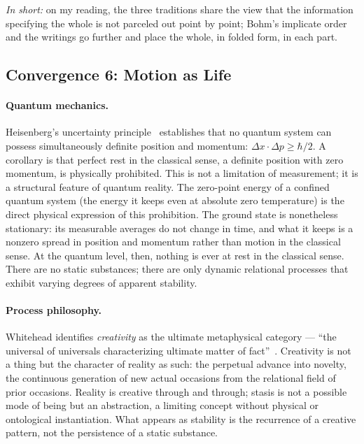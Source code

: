 \emph{In short:} on my reading, the three traditions share the view that
the information specifying the whole is not parceled out point by point;
Bohm's implicate order and the \bahai writings go further and place the whole,
in folded form, in each part.

\subsection{Convergence 6: Motion as Life}

\paragraph{Quantum mechanics.}
Heisenberg's uncertainty principle~\citeyearpar{Heisenberg1927} establishes
that no quantum system can possess simultaneously definite position and
momentum: $\Delta x \cdot \Delta p \geq \hbar/2$.
A corollary is that perfect rest in the classical sense, a definite position with zero momentum, is physically prohibited.
This is not a limitation of measurement; it is a structural feature of
quantum reality.
The zero-point energy of a confined quantum system (the energy it keeps even at absolute zero temperature) is the direct physical expression of this prohibition. The ground state is nonetheless stationary: its measurable averages do not change in time, and what it keeps is a nonzero spread in position and momentum rather than motion in the classical sense. At the quantum level, then, nothing is ever at rest in the classical sense.
There are no static substances; there are only dynamic relational processes
that exhibit varying degrees of apparent stability.

\paragraph{Process philosophy.}
Whitehead identifies \emph{creativity} as the ultimate metaphysical
category --- ``the universal of universals characterizing ultimate
matter of fact''~\citep[p.~21]{Whitehead1929}. %
Creativity is not a thing but the character of reality as such:
the perpetual advance into novelty, the continuous generation of new
actual occasions from the relational field of prior occasions.
Reality is creative through and through; stasis is not a possible mode
of being but an abstraction, a limiting concept without physical or
ontological instantiation.
What appears as stability is the recurrence of a creative pattern, not
the persistence of a static substance.

